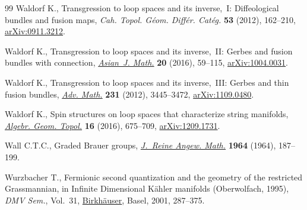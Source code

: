 \begin{thebibliography}{99}
Waldorf K., Transgression to loop spaces and its inverse,~{I}: {D}iffeological
 bundles and fusion maps, \textit{Cah. Topol. G\'eom. Diff\'er. Cat\'eg.}
 \textbf{53} (2012), 162--210, \href{https://arxiv.org/abs/0911.3212}{arXiv:0911.3212}.

Waldorf K., Transgression to loop spaces and its inverse,~{II}: {G}erbes and
 fusion bundles with connection, \href{https://doi.org/10.4310/AJM.2016.v20.n1.a4}{\textit{Asian~J. Math.}} \textbf{20} (2016),
 59--115, \href{https://arxiv.org/abs/1004.0031}{arXiv:1004.0031}.

Waldorf K., Transgression to loop spaces and its inverse,~{III}: {G}erbes and
 thin fusion bundles,  \href{https://doi.org/10.1016/j.aim.2012.08.016}{\textit{Adv. Math.}} \textbf{231} (2012), 3445--3472,
 \href{https://arxiv.org/abs/1109.0480}{arXiv:1109.0480}.

Waldorf K., Spin structures on loop spaces that characterize string manifolds,
 \href{https://doi.org/10.2140/agt.2016.16.675}{\textit{Algebr. Geom. Topol.}} \textbf{16} (2016), 675--709,
 \href{https://arxiv.org/abs/1209.1731}{arXiv:1209.1731}.

Wall C.T.C., Graded {B}rauer groups, \href{https://doi.org/10.1515/crll.1964.213.187}{\textit{J.~Reine Angew. Math.}}
 \textbf{1964} (1964), 187--199.

Wurzbacher T., Fermionic second quantization and the geometry of the restricted
 {G}rassmannian, in Infinite {D}imensional {K}\"ahler manifolds
 ({O}berwolfach, 1995), \textit{DMV Sem.}, Vol.~31, \href{https://doi.org/10.1007/978-3-0348-8227-9_6}{Birkh\"auser}, Basel, 2001,
 287--375.

\end{thebibliography}\LastPageEnding
